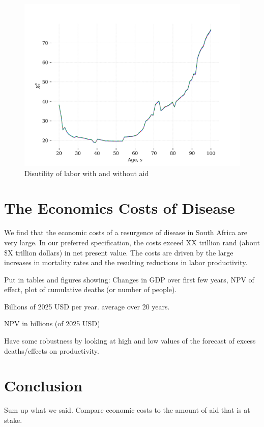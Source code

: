 \documentclass[letterpaper,12pt]{article}
\theoremstyle{definition}
\begin{document}
\begin{spacing}{1.5}
\begin{figure}[h]
    \caption{Disutility of labor with and without aid}
    \centering
    \includegraphics[scale=0.75]{./tables_figures/chi_n_values.png}
\end{figure}

\section{The Economics Costs of Disease}\label{SecResults}

We find that the economic costs of a resurgence of disease in South Africa are very large.  In our preferred specification, the costs exceed XX trillion rand (about \$X trillion dollars) in net present value.  The costs are driven by the large increases in mortality rates and the resulting reductions in labor productivity.

Put in tables and figures showing: Changes in GDP over first few years, NPV of effect, plot of cumulative deaths (or number of people).

Billions of 2025 USD per year. average over 20 years.


NPV in billions (of 2025 USD)


Have some robustness by looking at high and low values of the forecast of excess deaths/effects on productivity.

\section{Conclusion}\label{SecConc}

Sum up what we said.  Compare economic costs to the amount of aid that is at stake.

\end{spacing}
\newpage

\end{document}
